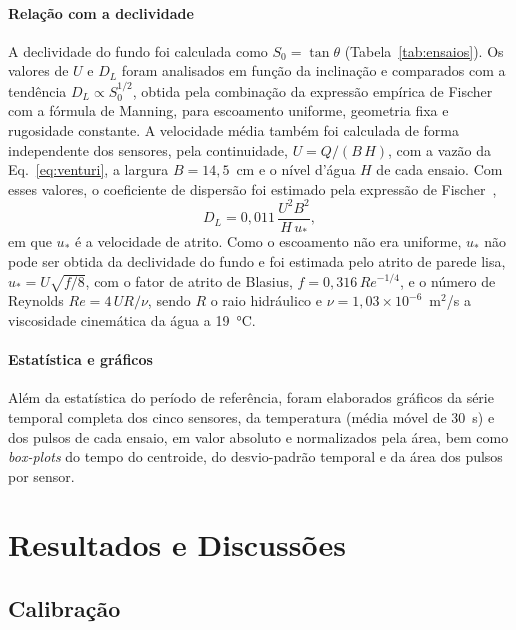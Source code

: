 \documentclass[12pt,a4paper]{article}
\begin{document}
\paragraph{Relação com a declividade}
A declividade do fundo foi calculada como $S_0 = \tan\theta$ (Tabela~\ref{tab:ensaios}). Os valores de $U$ e $D_L$ foram analisados em função da inclinação e comparados com a tendência $D_L \propto S_0^{1/2}$, obtida pela combinação da expressão empírica de Fischer~\cite{fischer1975} com a fórmula de Manning, para escoamento uniforme, geometria fixa e rugosidade constante. A velocidade média também foi calculada de forma independente dos sensores, pela continuidade, $U = Q/(B\,H)$, com a vazão da Eq.~\eqref{eq:venturi}, a largura $B = 14{,}5$~cm e o nível d'água $H$ de cada ensaio. Com esses valores, o coeficiente de dispersão foi estimado pela expressão de Fischer~\cite{fischer1975},
\begin{equation}
  D_L = 0{,}011\,\frac{U^{2}B^{2}}{H\,u_*},
  \label{eq:fischer_dl}
\end{equation}
em que $u_*$ é a velocidade de atrito. Como o escoamento não era uniforme, $u_*$ não pode ser obtida da declividade do fundo e foi estimada pelo atrito de parede lisa, $u_* = U\sqrt{f/8}$, com o fator de atrito de Blasius, $f = 0{,}316\,Re^{-1/4}$, e o número de Reynolds $Re = 4\,U R/\nu$, sendo $R$ o raio hidráulico e $\nu = 1{,}03\times10^{-6}$~m$^2$/s a viscosidade cinemática da água a 19~°C.


\paragraph{Estatística e gráficos}
Além da estatística do período de referência, foram elaborados gráficos da série temporal completa dos cinco sensores, da temperatura (média móvel de 30~s) e dos pulsos de cada ensaio, em valor absoluto e normalizados pela área, bem como \emph{box-plots} do tempo do centroide, do desvio-padrão temporal e da área dos pulsos por sensor.

\section{Resultados e Discussões}
\label{sec:resultados}

\subsection{Calibração}
\label{sec:res_calibracao}
\end{document}
